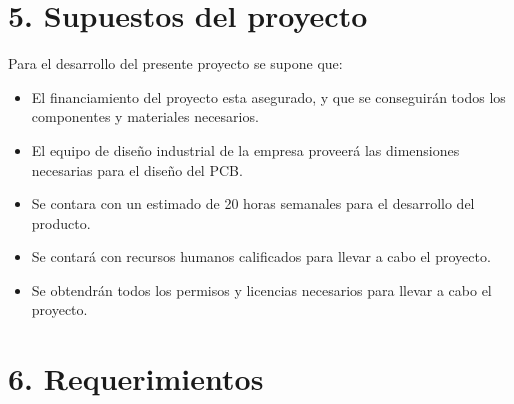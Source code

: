 \documentclass[
11pt, %
codirector, %
]{charter}
\begin{document}
\section{5. Supuestos del proyecto}
\label{sec:supuestos}

Para el desarrollo del presente proyecto se supone que:

\begin{itemize}
	\item El financiamiento del proyecto esta asegurado, y que se conseguirán todos los componentes y materiales necesarios.
	\item El equipo de diseño industrial de la empresa proveerá las dimensiones necesarias para el diseño del PCB.
	\item Se contara con un estimado de 20 horas semanales para el desarrollo del producto.
	\item Se contará con recursos humanos calificados para llevar a cabo el proyecto.
	\item Se obtendrán todos los permisos y licencias necesarios para llevar a cabo el proyecto.
\end{itemize}

\section{6. Requerimientos}
\label{sec:requerimientos}
\end{document}
